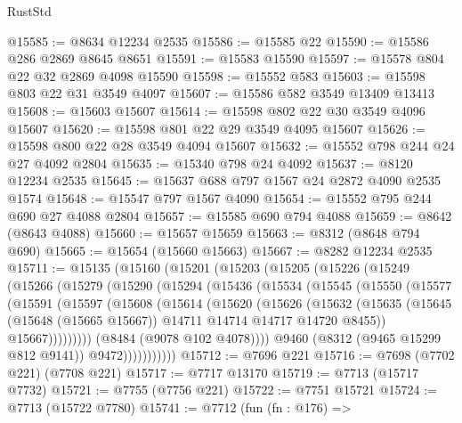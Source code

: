 \begin{lexlean}{RustStd}
\begin{coremodule}
@15585 := @8634 @12234 @2535
@15586 := @15585 @22
@15590 := @15586 @286 @2869 @8645 @8651
@15591 := @15583 @15590
@15597 := @15578 @804 @22 @32 @2869 @4098 @15590
@15598 := @15552 @583
@15603 := @15598 @803 @22 @31 @3549 @4097
@15607 := @15586 @582 @3549 @13409 @13413
@15608 := @15603 @15607
@15614 := @15598 @802 @22 @30 @3549 @4096 @15607
@15620 := @15598 @801 @22 @29 @3549 @4095 @15607
@15626 := @15598 @800 @22 @28 @3549 @4094 @15607
@15632 := @15552 @798 @244 @24 @27 @4092 @2804
@15635 := @15340 @798 @24 @4092
@15637 := @8120 @12234 @2535
@15645 := @15637 @688 @797 @1567 @24 @2872 @4090 @2535 @1574
@15648 := @15547 @797 @1567 @4090
@15654 := @15552 @795 @244 @690 @27 @4088 @2804
@15657 := @15585 @690 @794 @4088
@15659 := @8642 (@8643 @4088)
@15660 := @15657 @15659
@15663 := @8312 (@8648 @794 @690)
@15665 := @15654 (@15660 @15663)
@15667 := @8282 @12234 @2535
@15711 := @15135
    (@15160
      (@15201
        (@15203
          (@15205
            (@15226
              (@15249
                (@15266
                  (@15279
                    (@15290
                      (@15294
                        (@15436
                          (@15534
                            (@15545
                              (@15550
                                (@15577
                                  (@15591
                                    (@15597
                                      (@15608
                                        (@15614
                                          (@15620
                                            (@15626
                                              (@15632
                                                (@15635
                                                  (@15645
                                                    (@15648 (@15665 @15667))
                                                    @14711
                                                    @14714
                                                    @14717
                                                    @14720
                                                    @8455))
                                                @15667)))))))))
                              (@8484 (@9078 @102 @4078))))
                          @9460
                          (@8312 (@9465 @15299 @812 @9141))
                          @9472)))))))))))
@15712 := @7696 @221
@15716 := @7698 (@7702 @221) (@7708 @221)
@15717 := @7717 @13170
@15719 := @7713 (@15717 @7732)
@15721 := @7755 (@7756 @221)
@15722 := @7751 @15721
@15724 := @7713 (@15722 @7780)
@15741 := @7712
    (fun (fn : @176) =>

\end{coremodule}
\end{lexlean}

